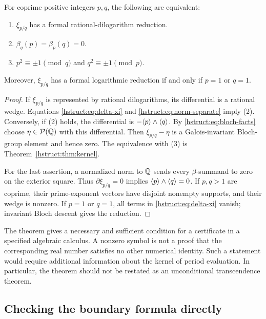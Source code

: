 \begin{theorem}\label{hstruct:thm:reduction}
For coprime positive integers $p,q$, the following are equivalent:
\begin{enumerate}
\item $\xi_{p/q}$ has a formal rational-dilogarithm reduction.
\item $\beta_q(p)=\beta_p(q)=0$.
\item $p^2\equiv\pm1\pmod q$ and $q^2\equiv\pm1\pmod p$.
\end{enumerate}
Moreover, $\xi_{p/q}$ has a formal logarithmic reduction if and only if
$p=1$ or $q=1$.
\end{theorem}
\begin{proof}
If $\xi_{p/q}$ is represented by rational dilogarithms, its differential
is a rational wedge. Equations \eqref{hstruct:eq:delta-xi} and
\eqref{hstruct:eq:norm-separate} imply (2). Conversely, if (2) holds, the
differential is $-\langle p\rangle\wedge\langle q\rangle$. By \eqref{hstruct:eq:bloch-facts} choose
$\eta\in\mathcal P(\mathbb{Q})$ with this differential. Then
$\xi_{p/q}-\eta$ is a Galois-invariant Bloch-group element and hence
zero. The equivalence with (3) is Theorem~\ref{hstruct:thm:kernel}.

For the last assertion, a normalized norm to $\mathbb{Q}$ sends every
$\beta$-summand to zero on the exterior square. Thus
$\partial\xi_{p/q}=0$ implies $\langle p\rangle\wedge\langle q\rangle=0$. If $p,q>1$
are coprime, their prime-exponent vectors have disjoint nonempty supports,
and their wedge is nonzero. If $p=1$ or $q=1$, all terms in
\eqref{hstruct:eq:delta-xi} vanish; invariant Bloch descent gives the reduction.
\end{proof}

\begin{remark}
The theorem gives a necessary and sufficient condition for a certificate
in a specified algebraic calculus. A nonzero symbol is not a proof that
the corresponding real number satisfies no other numerical identity.
Such a statement would require additional information about the kernel
of period evaluation. In particular, the theorem should not be restated
as an unconditional transcendence theorem.
\end{remark}

\subsection{Checking the boundary formula directly}

